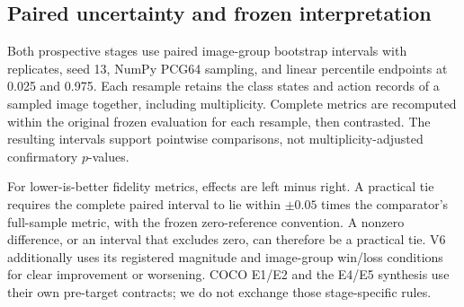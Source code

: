\subsection{Paired uncertainty and frozen interpretation}
Both prospective stages use paired image-group bootstrap intervals with
 replicates, seed 13, NumPy PCG64 sampling, and linear
percentile endpoints at 0.025 and 0.975. Each resample retains the class
states and action records of a sampled image together, including
multiplicity. Complete metrics are recomputed within the original frozen
evaluation for each resample, then contrasted. The resulting intervals
support pointwise comparisons, not
multiplicity-adjusted confirmatory $p$-values.

For lower-is-better fidelity metrics, effects are left minus right.
A practical tie requires the complete paired interval to lie within
$\pm 0.05$ times the comparator's full-sample metric, with the frozen
zero-reference convention. A nonzero difference, or an interval that
excludes zero, can therefore be a practical tie. V6 additionally uses its
registered magnitude and image-group win/loss conditions for clear
improvement or worsening. COCO E1/E2 and the E4/E5 synthesis use their own
pre-target contracts; we do not exchange those stage-specific rules.
